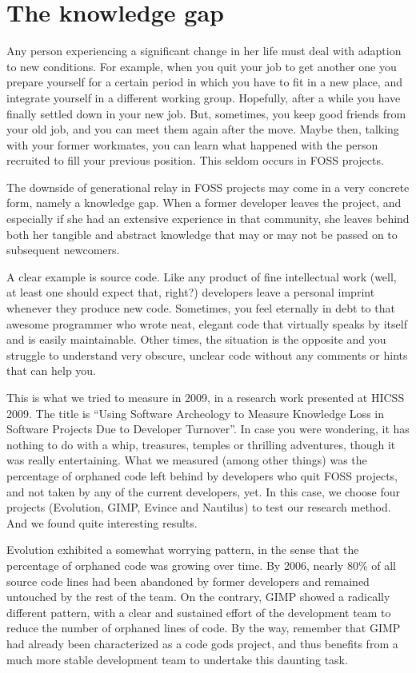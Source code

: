 \section*{The knowledge gap}

Any person experiencing a significant change in her life must deal with adaption
to new conditions. For example, when you quit your job to get another one you
prepare yourself for a certain period in which you have to fit in a new place,
and integrate yourself in a different working group. Hopefully, after a while
you have finally settled down in your new job. But, sometimes, you keep good
friends from your old job, and you can meet them again after the move. Maybe
then, talking with your former workmates, you can learn what happened with the
person recruited to fill your previous position. This seldom occurs in FOSS
projects.

The downside of generational relay in FOSS projects may come in a very concrete
form, namely a knowledge gap. When a former developer leaves the project, and
especially if she had an extensive experience in that community, she leaves
behind both her tangible and abstract knowledge that may or may not be passed
on to subsequent newcomers.

A clear example is source code. Like any product of fine intellectual work
(well, at least one should expect that, right?) developers leave a personal
imprint whenever they produce new code. Sometimes, you feel eternally in debt to
that awesome programmer who wrote neat, elegant code that virtually speaks by
itself and is easily maintainable. Other times, the situation is the opposite
and you struggle to understand very obscure, unclear code without any comments
or hints that can help you.

This is what we tried to measure in 2009, in a research work presented at HICSS
2009. The title is ``Using Software Archeology to Measure Knowledge Loss in
Software Projects Due to Developer Turnover''. In case you were wondering, it has
nothing to do with a whip, treasures, temples or thrilling adventures, though it
was really entertaining. What we measured (among other things) was the
percentage of orphaned code left behind by developers who quit FOSS projects,
and not taken by any of the current developers, yet. In this case, we choose
four projects (Evolution, GIMP, Evince and Nautilus) to test our research
method. And we found quite interesting results.

Evolution exhibited a somewhat worrying pattern, in the sense that the
percentage of orphaned code was growing over time. By 2006, nearly 80\% of all
source code lines had been abandoned by former developers and remained untouched
by the rest of the team. On the contrary, GIMP showed a radically different
pattern, with a clear and sustained effort of the development team to reduce the
number of orphaned lines of code. By the way, remember that GIMP had already
been characterized  as a code gods project, and thus benefits from a much more
stable development team to undertake this daunting task.

